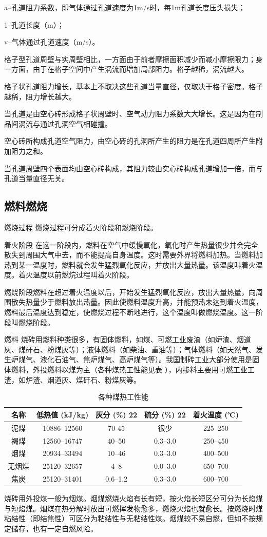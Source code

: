 \documentclass{ctexbook}
\begin{document}
a--孔道阻力系数，即气体通过孔道速度为1m/s时，每1m孔道长度压头损失；

1--孔道长度（m）；

v--气体通过孔道速度（m/s）。

格子型孔道周壁与实周壁相比，一方面由于前者摩擦面积减少而减小摩擦限力；身一方面，由于在格子空间中产生涡流而增加局部阻力。格子越稀，涡流越大。

格子状孔道阻力增长，基本上不取决这些孔道当量直径，仅取决于格子密度。格子越稀，阻力增长越大。

当孔道是由空心砖形成格子状周壁时、空气动力阻力系数大大增长。这是因为在制品间涡流与通过孔洞空气相碰撞。

空心砖所构成孔道空气阻力，由空心砖的孔洞所产生的阻力是在孔道四周所产生附加阻力之和。

当孔道周壁四个表面均由空心砖构成，其阻力较由实心砖构成孔道增加一倍，而与孔道当量直径无关。
\subsection{燃料燃烧}
燃烧过程 燃烧过程可分成着火阶段和燃烧阶段。

着火阶段 在这一阶段内，燃料在空气中缓慢氧化，氧化时产生热量很少并会完全散失到周围大气中去，而不能提高自身温度。这时需要外界将燃料加热。当燃料加热到某一温度时，燃料就会发生猛烈氧化反应，并放出大量热量。该温度叫着火温度。着火温度以前燃烷过程叫着火阶段。

燃烧阶段燃料在超过着火温度以后，开始发生猛烈氧化反应，放出大量热量，向周围散失热量少于燃料放出热量。因此使燃料温度升高，并能预热未达到着火温度，燃料最后温度达到稳定，使燃烧过程不断地进行，这个温度叫做燃烧温度。这一阶段叫燃烧阶段。

燃料 烧砖用燃料种类很多，有固体燃料，如煤、可燃工业废渣（如炉渣、烟道灰、煤矸石、粉煤灰等）；液体燃料（如柴油、重油等）；气体燃料（如天然气、发生炉煤气、液化石油气、焦炉煤气、高炉煤气等）。我国制砖工业大部分使用是固体燃料，外投燃料以煤为主（各种煤热工性能见表 ），内掺料主要用可燃工业工渣，如炉渣、烟道灰、煤矸石、粉煤灰等。

\begin{table}[htbp]
	\centering
	\caption{各种煤热工性能}
	\begin{tabular}{c|c|c|c|c}
		\hline
		名称  &低热值 (kJ/kg)& 灰分 (\%) 22& 硫分 (\%) 22& 着火温度 (℃)\\ \hline
		泥煤  &10886--12560&70 45   &很少    &225--250\\ \hline
		褐煤  &12560--16747&40--50  &0.3--3.0&250--450\\ \hline
		烟煤&20934--33494  &10--46  &0.3--3.0&400--500\\ \hline
		无烟煤&25120--32657&4--8    &0.0--3.0&650--700\\ \hline
		焦炭  &25120--31401&0.6--1.2&0.3--3.0&600--700\\ \hline
	\end{tabular}%
	\label{tab:meiregong}%
\end{table}%
烧砖用外投煤一般为烟煤。烟煤燃烧火焰有长有短，按火焰长短区分可分为长焰煤与短焰煤。烟煤在热分解时放出可燃挥发物愈多，燃烧火焰也就愈长。按燃烧时煤粘结性（即结焦性）可区分为粘结性与无粘结性煤。烟煤较不易自燃，但如不按规定储存，也有一定自燃风险。
\end{document}
